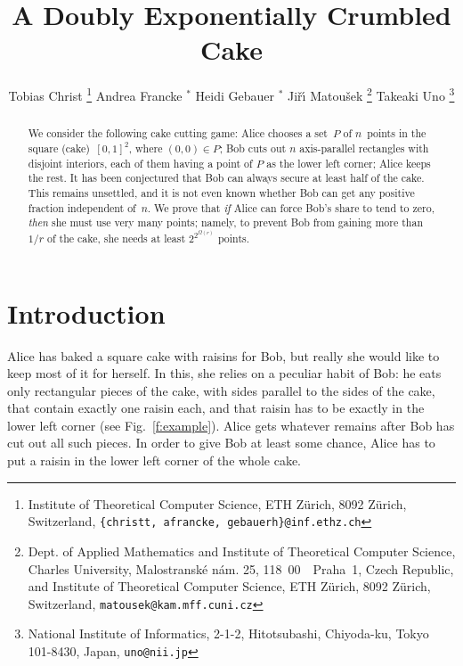 \documentclass[11pt]{article}
\begin{document}
\title
{A Doubly Exponentially Crumbled Cake}

\author{
{Tobias Christ \footnote{Institute of Theoretical Computer Science, ETH Z\"urich, 8092 Z\"urich, Switzerland, {\texttt{\{christt, afrancke, gebauerh\}@inf.ethz.ch}} } }\quad
{Andrea Francke $^*$} \quad
{Heidi Gebauer $^*$} \quad
{Ji\v{r}\'{\i} Matou\v{s}ek \footnote{Dept. of Applied Mathematics and Institute of Theoretical Computer Science, Charles University, Malostransk\'{e} n\'{a}m. 25,
118~00~~Praha~1, Czech Republic, and Institute of Theoretical Computer Science, ETH Z\"urich, 8092 Z\"urich, Switzerland, {\texttt{matousek@kam.mff.cuni.cz}}} } \quad
{Takeaki Uno \footnote{National Institute of Informatics, 2-1-2, Hitotsubashi, Chiyoda-ku,
Tokyo 101-8430, Japan, {\texttt{uno@nii.jp}}}}
}

\maketitle
\begin{abstract}
We consider the following cake cutting game: 
Alice chooses a set~$P$ of $n$~points in
the square (cake)~$[0,1]^2$, where $(0,0) \in P$; 
Bob cuts out $n$ axis-parallel rectangles with disjoint
interiors, each of them having a point of $P$ as the
lower left corner;  Alice keeps the rest.
It has been conjectured that Bob can always secure at least half
of the cake. This remains unsettled, and it is not even known
whether Bob can get any positive fraction independent of~$n$.
 We prove that \emph{if} Alice can force Bob's share
to tend to zero, \emph{then} she must use very many points; namely,
to prevent Bob from gaining more than $1/r$ of the cake,
she needs at least $2^{2^{\Omega(r)}}$ points. 
\end{abstract}
\section{Introduction}

Alice has baked a square cake with raisins for Bob, but
really she would like to keep most of it for herself.
In this, she relies on a peculiar habit of Bob: he eats only
rectangular pieces of the cake, with sides parallel
to the sides of the cake, that contain exactly one raisin each,
and that raisin has to be exactly in the lower left corner
(see Fig.~\ref{f:example}). Alice gets whatever remains
after Bob has cut out all such pieces. In order to give
Bob at least some chance, Alice has to put a raisin
in the lower left corner of the whole cake. 
\end{document}
